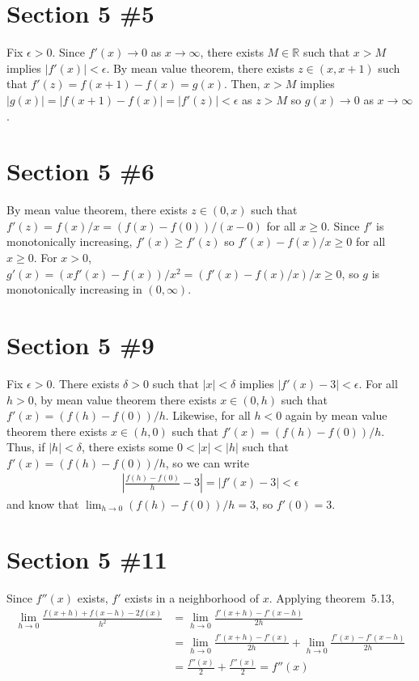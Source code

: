 \documentclass{scrartcl}
\begin{document}
\section{Section 5 \#5}
Fix \(\epsilon > 0\).
Since \(f'(x) \to 0\) as \(x \to \infty\), there exists \(M \in \mathbb{R}\) such that \(x > M\) implies \(|f'(x)| < \epsilon\).
By mean value theorem, there exists \(z \in (x, x + 1)\) such that \(f'(z) = f(x + 1) - f(x) = g(x)\).
Then, \(x > M\) implies \(|g(x)| = |f(x + 1) - f(x)| = |f'(z)| < \epsilon\) as \(z > M\) so \(g(x) \to 0\) as \(x \to \infty\).

\section{Section 5 \#6}
By mean value theorem, there exists \(z \in (0, x)\) such that \(f'(z) = f(x) / x = (f(x) - f(0)) / (x - 0)\) for all \(x \geq 0\).
Since \(f'\) is monotonically increasing, \(f'(x) \geq f'(z)\) so \(f'(x) - f(x) / x \geq 0\) for all \(x \geq 0\).
For \(x > 0\), \(g'(x) = (xf'(x) - f(x)) / x^2 = (f'(x) - f(x) / x) / x \geq 0\), so \(g\) is monotonically increasing in \((0, \infty)\).

\section{Section 5 \#9}
Fix \(\epsilon > 0\).
There exists \(\delta > 0\) such that \(|x| < \delta\) implies \(|f'(x) - 3| < \epsilon\).
For all \(h > 0\), by mean value theorem there exists \(x \in (0, h)\) such that \(f'(x) = (f(h) - f(0)) / h\).
Likewise, for all \(h < 0\) again by mean value theorem there exists \(x \in (h, 0)\) such that \(f'(x) = (f(h) - f(0)) / h\).
Thus, if \(|h| < \delta\), there exists some \(0 < |x| < |h|\) such that \(f'(x) = (f(h) - f(0)) / h\), so we can write
\begin{align*}
  \left| \frac{f(h) - f(0)}{h} - 3 \right| = \left| f'(x) - 3 \right| < \epsilon
\end{align*}
and know that \(\lim_{h \to 0} (f(h) - f(0)) / h = 3\), so \(f'(0) = 3\).

\section{Section 5 \#11}
Since \(f''(x)\) exists, \(f'\) exists in a neighborhood of \(x\).
Applying theorem~5.13,
\begin{align*}
  \lim_{h \to 0} \frac{f(x + h) + f(x - h) - 2f(x)}{h^2}
  &= \lim_{h \to 0} \frac{f'(x + h) - f'(x - h)}{2h} \\
  &= \lim_{h \to 0} \frac{f'(x + h) - f'(x)}{2h} + \lim_{h \to 0} \frac{f'(x) - f'(x - h)}{2h} \\
  &= \frac{f''(x)}{2} + \frac{f''(x)}{2} = f''(x)
\end{align*}
\end{document}
